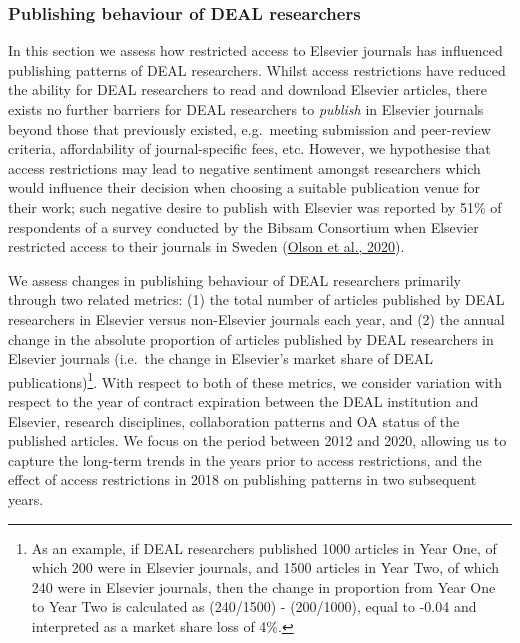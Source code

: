 \documentclass[
]{article}
\begin{document}
\hypertarget{publishing-behaviour-of-deal-researchers}{%
\subsubsection{Publishing behaviour of DEAL researchers}\label{publishing-behaviour-of-deal-researchers}}

In this section we assess how restricted access to Elsevier journals has influenced publishing patterns of DEAL researchers. Whilst access restrictions have reduced the ability for DEAL researchers to read and download Elsevier articles, there exists no further barriers for DEAL researchers to \emph{publish} in Elsevier journals beyond those that previously existed, e.g.~meeting submission and peer-review criteria, affordability of journal-specific fees, etc. However, we hypothesise that access restrictions may lead to negative sentiment amongst researchers which would influence their decision when choosing a suitable publication venue for their work; such negative desire to publish with Elsevier was reported by 51\% of respondents of a survey conducted by the Bibsam Consortium when Elsevier restricted access to their journals in Sweden (\href{http://doi.org/10.1629/uksg.507}{Olson et al., 2020}).

We assess changes in publishing behaviour of DEAL researchers primarily through two related metrics: (1) the total number of articles published by DEAL researchers in Elsevier versus non-Elsevier journals each year, and (2) the annual change in the absolute proportion of articles published by DEAL researchers in Elsevier journals (i.e.~the change in Elsevier's market share of DEAL publications)\footnote{As an example, if DEAL researchers published 1000 articles in Year One, of which 200 were in Elsevier journals, and 1500 articles in Year Two, of which 240 were in Elsevier journals, then the change in proportion from Year One to Year Two is calculated as (240/1500) - (200/1000), equal to -0.04 and interpreted as a market share loss of 4\%.}. With respect to both of these metrics, we consider variation with respect to the year of contract expiration between the DEAL institution and Elsevier, research disciplines, collaboration patterns and OA status of the published articles. We focus on the period between 2012 and 2020, allowing us to capture the long-term trends in the years prior to access restrictions, and the effect of access restrictions in 2018 on publishing patterns in two subsequent years.
\end{document}
